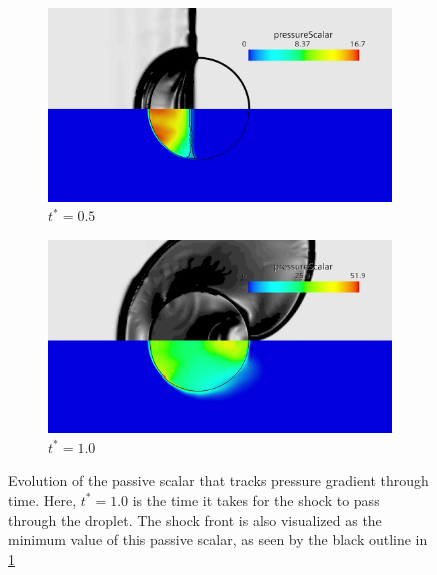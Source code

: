 \documentclass{UCF_ETD}
\begin{document}
\begin{figure}[htp!]
    \centering
    \begin{subfigure}{0.4\textwidth}
        \includegraphics[width=\textwidth]{Figures/pressureGradScalarMiddle.jpg}
        \caption{$t^{*} = 0.5$}
        \label{fig:t_star_0.5}
    \end{subfigure}
    \begin{subfigure}{0.4\textwidth}
        \includegraphics[width=\textwidth]{Figures/pressureGradScalarfinal.jpg}
        \caption{$t^{*} = 1.0$}
        \label{fig:t_star_1}
    \end{subfigure}
    \caption{Evolution of the passive scalar that tracks pressure gradient through time. Here, $t^{*} = 1.0$ is the time it takes for the shock to pass through the droplet. The shock front is also visualized as the minimum value of this passive scalar, as seen by the black outline in \ref{fig:t_star_0.5}}
    \label{fig:shearScalar}
\end{figure}
\end{document}
